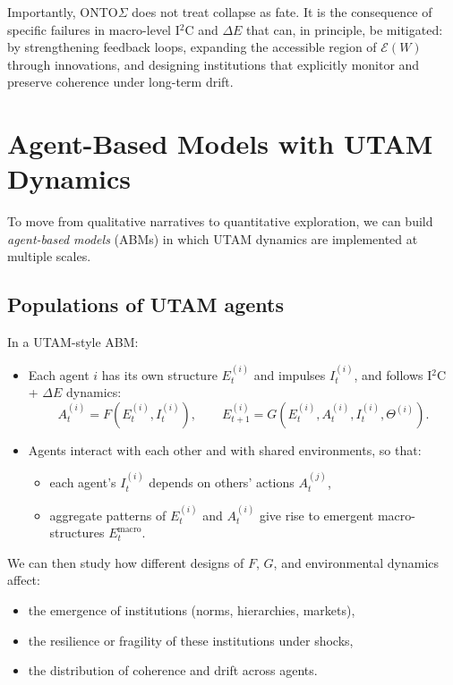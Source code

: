\documentclass[12pt,a4paper]{report}
\newcommand{\Will}{W}
\begin{document}
Importantly, ONTO$\Sigma$ does not treat collapse as fate. It is the consequence of specific failures in macro-level I$^2$C and $\Delta E$ that can, in principle, be mitigated: by strengthening feedback loops, expanding the accessible region of \(\mathcal{E}(\Will)\) through innovations, and designing institutions that explicitly monitor and preserve coherence under long-term drift.

\section{Agent-Based Models with UTAM Dynamics}

To move from qualitative narratives to quantitative exploration, we can build \emph{agent-based models} (ABMs) in which UTAM dynamics are implemented at multiple scales.

\subsection*{Populations of UTAM agents}

In a UTAM-style ABM:

\begin{itemize}[leftmargin=2em]
    \item Each agent \(i\) has its own structure \(E_t^{(i)}\) and impulses \(I_t^{(i)}\), and follows I$^2$C + $\Delta E$ dynamics:
    \[
        A_t^{(i)} = F(E_t^{(i)}, I_t^{(i)}), \qquad
        E_{t+1}^{(i)} = G(E_t^{(i)}, A_t^{(i)}, I_t^{(i)}, \Theta^{(i)}).
    \]
    \item Agents interact with each other and with shared environments, so that:
    \begin{itemize}
        \item each agent's \(I_t^{(i)}\) depends on others' actions \(A_t^{(j)}\),
        \item aggregate patterns of \(E_t^{(i)}\) and \(A_t^{(i)}\) give rise to emergent macro-structures \(E_t^{\mathrm{macro}}\).
    \end{itemize}
\end{itemize}

We can then study how different designs of \(F\), \(G\), and environmental dynamics affect:

\begin{itemize}[leftmargin=2em]
    \item the emergence of institutions (norms, hierarchies, markets),
    \item the resilience or fragility of these institutions under shocks,
    \item the distribution of coherence and drift across agents.
\end{itemize}
\end{document}
